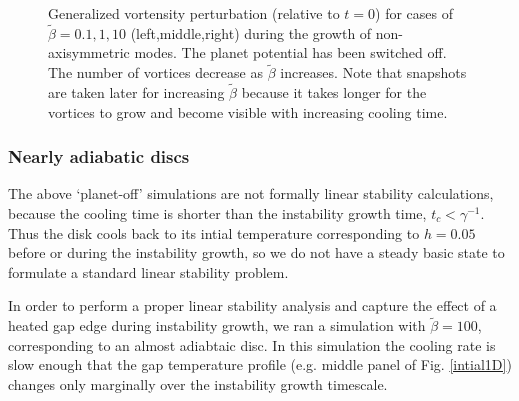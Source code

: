 \begin{figure}
{  }  
  \caption{Generalized vortensity perturbation (relative to $t=0$) for
    cases of $\tilde{\beta}=0.1,1,10$ (left,middle,right) during
    the growth of non-axisymmetric modes. The planet potential has
    been switched off.  The number of vortices
    decrease as $\tilde{\beta}$ increases. Note that snapshots are
    taken later for increasing $\tilde{\beta}$ because it takes longer
    for the vortices to grow and become visible with increasing cooling time. 
    \label{2Dlinear} 
  } 
\end{figure}

\subsubsection{Nearly adiabatic discs}
\label{adiabatic_section}
The above `planet-off' simulations are not formally linear
stability calculations, because the cooling time is shorter
than the instability growth time, 
%
$t_c<\gamma^{-1}$.  
Thus the disk cools back to its intial temperature corresponding to
$h=0.05$ before or during the instability growth, so we do not
have a steady basic state to formulate a standard linear stability 
problem. %

In order to perform a proper linear stability analysis and capture the
effect of a heated gap edge during instability growth, we ran a simulation  with
$\tilde{\beta}=100$, corresponding to an almost adiabtaic disc.  
In this simulation the cooling rate is slow enough that the gap 
temperature profile (e.g. middle panel of Fig. \ref{intial1D}) changes
only marginally over the instability growth timescale. %

